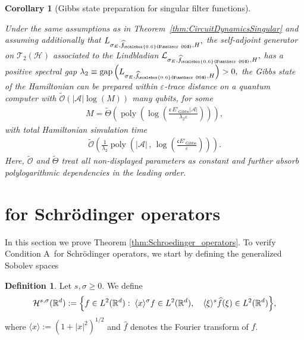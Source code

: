 \documentclass[11pt]{amsart}
\newcommand{\1}{\mathbbm{1}}
\renewcommand{\theconditionA}{A}
\newcommand{\cH}{\mathcal{H}}
\newcommand{\cL}{\mathcal{L}}
\newcommand{\eps}{\varepsilon}
\renewcommand{\epsilon}{\varepsilon}
\newcommand{\cA}{\mathcal{A}}
\newcommand{\hatfM}{\widehat{f}_{\!\scalebox{0.6}{$\mathscr{M}$}}
}
\theoremstyle{plain}
\newtheorem{corollary}[theorem]{Corollary}
\theoremstyle{definition}
\newtheorem{definition}[theorem]{Definition}
\theoremstyle{remark}
\numberwithin{equation}{section}
\begin{document}
\begin{corollary} [Gibbs state preparation for singular filter functions]
\label{cor:GibbsCircuitSingular}

Under the same assumptions as in Theorem~\ref{thm:CircuitDynamicsSingular} and assuming additionally that  $L_{\sigma_E,\hatfM,H},$ the self-adjoint generator on $\mathscr{T}_2(\cH)$ associated to the Lindbladian $\cL_{\sigma_E,\hatfM,H},$ has a positive spectral gap 
$\lambda_2 \equiv \operatorname{gap}\left(L_{\sigma_E,\hatfM,H}\right) >0,$ 
the Gibbs state of the Hamiltonian can be prepared within $\eps$-trace distance on a quantum computer with $\widetilde{\mathcal{O}}(|\cA|\log(M))$ many qubits, for some 
\begin{align*}    
M =\widetilde\Theta\left(\operatorname{poly}\left(\log\left(\frac{\mathfrak{c}\,E'_{\operatorname{Gibbs}}|\cA|}{\lambda_2 \eps}\right)\right)\right), 
\end{align*}
with total Hamiltonian simulation time 
\begin{align*}
\widetilde{\mathcal{O}}\left(\frac{1}{\lambda_2}\operatorname{poly}\left(|\mathcal{A}|\,,\,\log\left(\frac{\mathfrak{c}E'_{\operatorname{Gibbs}}}{\epsilon}\right)\right)\right).
    \end{align*} 
Here, $\widetilde{\mathcal{O}}$ and $\widetilde\Theta$ treat all non-displayed parameters as constant
and further absorb  polylogarithmic dependencies in the leading order.
\end{corollary}



\appendix



\section{ for Schr\"odinger operators}
\label{appendixC}
In this section we prove Theorem \ref{thm:Schroedinger_operators}. To verify Condition \theconditionA \ for Schr\"odinger operators, we start by defining the generalized Sobolev spaces
\begin{definition}
Let $s,\sigma \ge 0$. We define
\[
\mathcal{H}^{s,\sigma}(\mathbb{R}^d)
:=
\Bigl\{
f\in L^2(\mathbb{R}^d)
:\;
\langle x\rangle^\sigma f \in L^2(\mathbb{R}^d),
\quad
\langle \xi\rangle^s \widehat{f}(\xi)\in L^2(\mathbb{R}^d)
\Bigr\},
\]
where $\langle x\rangle := (1+|x|^2)^{1/2}$ and $\widehat{f}$ denotes the Fourier transform of $f$.
\end{definition}
\end{document}

